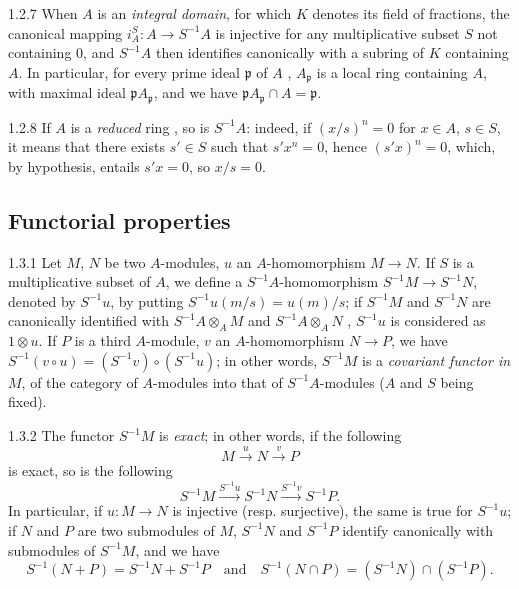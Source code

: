 \documentclass{book}
\begin{document}
\begin{env}{1.2.7}
\label{env-0.1.2.7}
When $A$ is an \emph{integral domain}, for which $K$ denotes its field of fractions, the canonical mapping $i_A^S\colon A\to S^{-1}A$
is injective for any multiplicative subset $S$ not containing $0$, and $S^{-1}A$ then identifies canonically with a subring of $K$
containing $A$. In particular, for every prime ideal $\mathfrak{p}$ of $A$ , $A_\mathfrak{p}$ is a local ring containing $A$,
with maximal ideal $\mathfrak{p}A_\mathfrak{p}$, and we have $\mathfrak{p}A_\mathfrak{p}\cap A=\mathfrak{p}$.
\end{env}

\begin{env}{1.2.8}
\label{env-0.1.2.8}
If $A$ is a \emph{reduced} ring , so is $S^{-1}A$: indeed, if $(x/s)^n=0$ for $x\in A$, $s\in S$, it means that
there exists $s'\in S$ such that $s'x^n=0$, hence $(s'x)^n=0$, which, by hypothesis, entails $s'x=0$, so $x/s=0$.
\end{env}

\subsection{Functorial properties}
\label{0-prelim-1.3}

\begin{env}{1.3.1}
\label{env-0.1.3.1}
Let $M$, $N$ be two $A$-modules, $u$ an $A$-homomorphism $M\to N$. If $S$ is a multiplicative subset of $A$,
we define a $S^{-1}A$-homomorphism $S^{-1}M\to S^{-1}N$, denoted by $S^{-1}u$, by putting
$S^{-1}u(m/s)=u(m)/s$; if $S^{-1}M$ and $S^{-1}N$ are canonically identified with $S^{-1}A\otimes_A M$ and
$S^{-1}A\otimes_A N$ , $S^{-1}u$ is considered as $1\otimes u$. If $P$ is a third $A$-module,
$v$ an $A$-homomorphism $N\to P$, we have $S^{-1}(v\circ u)=(S^{-1}v)\circ(S^{-1}u)$; in other words,
$S^{-1}M$ is a \emph{covariant functor in} $M$, of the category of $A$-modules into that of $S^{-1}A$-modules
($A$ and $S$ being fixed).
\end{env}

\begin{env}{1.3.2}
\label{env-0.1.3.2}
The functor $S^{-1}M$ is \emph{exact}; in other words, if the following
\[
  M\xrightarrow{u}N\xrightarrow{v}P
\]
is exact, so is the following
\[
  S^{-1}M\xrightarrow{S^{-1}u}S^{-1}N\xrightarrow{S^{-1}v}S^{-1}P.
\]
In particular, if $u\colon M\to N$ is injective (resp. surjective), the same is true for $S^{-1}u$;
 if $N$ and $P$ are two
submodules of $M$, $S^{-1}N$ and $S^{-1}P$ identify canonically with submodules of $S^{-1}M$, and we have
\[
  S^{-1}(N+P)=S^{-1}N+S^{-1}P\quad\text{and}\quad S^{-1}(N\cap P)=(S^{-1}N)\cap(S^{-1}P).
\]
\end{env}
\end{document}
